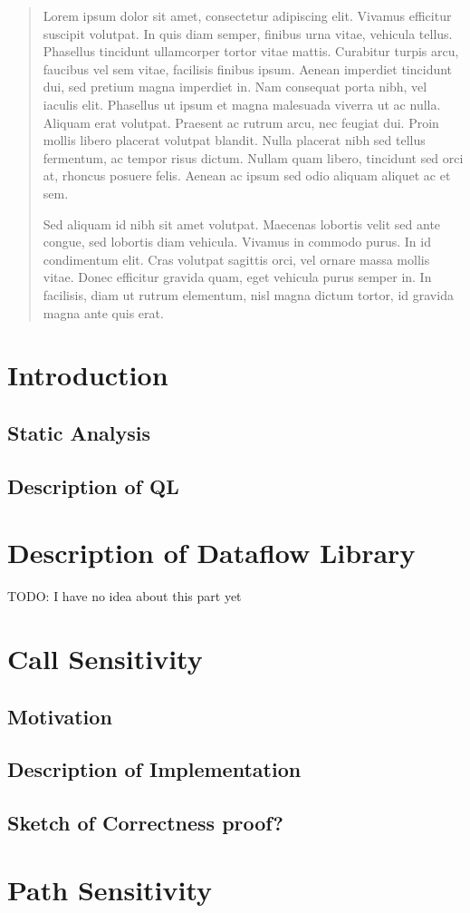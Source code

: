 \begin{abstract}
Lorem ipsum dolor sit amet, consectetur adipiscing elit. Vivamus efficitur suscipit volutpat. In quis diam semper, finibus urna vitae, vehicula tellus. Phasellus tincidunt ullamcorper tortor vitae mattis. Curabitur turpis arcu, faucibus vel sem vitae, facilisis finibus ipsum. Aenean imperdiet tincidunt dui, sed pretium magna imperdiet in. Nam consequat porta nibh, vel iaculis elit. Phasellus ut ipsum et magna malesuada viverra ut ac nulla. Aliquam erat volutpat. Praesent ac rutrum arcu, nec feugiat dui. Proin mollis libero placerat volutpat blandit. Nulla placerat nibh sed tellus fermentum, ac tempor risus dictum. Nullam quam libero, tincidunt sed orci at, rhoncus posuere felis. Aenean ac ipsum sed odio aliquam aliquet ac et sem.

Sed aliquam id nibh sit amet volutpat. Maecenas lobortis velit sed ante congue, sed lobortis diam vehicula. Vivamus in commodo purus. In id condimentum elit. Cras volutpat sagittis orci, vel ornare massa mollis vitae. Donec efficitur gravida quam, eget vehicula purus semper in. In facilisis, diam ut rutrum elementum, nisl magna dictum tortor, id gravida magna ante quis erat.
\end{abstract}
\tableofcontents

\newpage
\section{Introduction}
\subsection{Static Analysis}
\subsection{Description of QL}
\nocite{qlpaper}

\newpage
\section{Description of Dataflow Library}
TODO: I have no idea about this part yet

\newpage
\section{Call Sensitivity}
\subsection{Motivation}
\subsection{Description of Implementation}
\subsection{Sketch of Correctness proof?}

\newpage
\section{Path Sensitivity}


